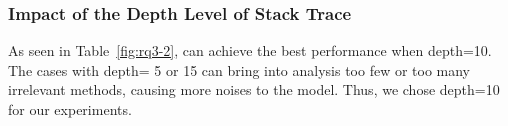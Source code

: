 
\subsubsection{Impact of the Depth Level of Stack Trace}

As seen in Table~\ref{fig:rq3-2},
{\tool} can achieve the best performance when depth=10. The cases with
depth= 5 or 15 can bring into analysis too few or too many irrelevant
methods, causing more noises to the model.
Thus, we chose depth=10 for our experiments.







